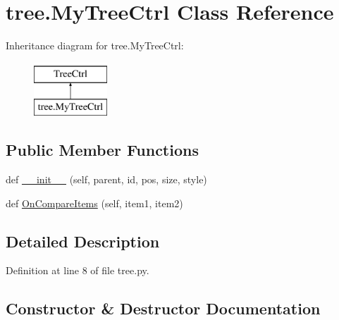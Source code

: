 \hypertarget{classtree_1_1MyTreeCtrl}{}\section{tree.\+My\+Tree\+Ctrl Class Reference}
\label{classtree_1_1MyTreeCtrl}
Inheritance diagram for tree.\+My\+Tree\+Ctrl\+:\begin{figure}[H]
\begin{center}
\leavevmode
\includegraphics[height=2.000000cm]{classtree_1_1MyTreeCtrl}
\end{center}
\end{figure}
\subsection*{Public Member Functions}
\begin{DoxyCompactItemize}
\item 
def \hyperlink{classtree_1_1MyTreeCtrl_a72b5dacce1e55adbb3bcde63cd4dcf2d}{\+\_\+\+\_\+init\+\_\+\+\_\+} (self, parent, id, pos, size, style)
\item 
def \hyperlink{classtree_1_1MyTreeCtrl_a8073a87006e33820096e0b2ea305af5c}{On\+Compare\+Items} (self, item1, item2)
\end{DoxyCompactItemize}


\subsection{Detailed Description}


Definition at line 8 of file tree.\+py.



\subsection{Constructor \& Destructor Documentation}
\mbox{\label{classtree_1_1MyTreeCtrl_a72b5dacce1e55adbb3bcde63cd4dcf2d}} 
